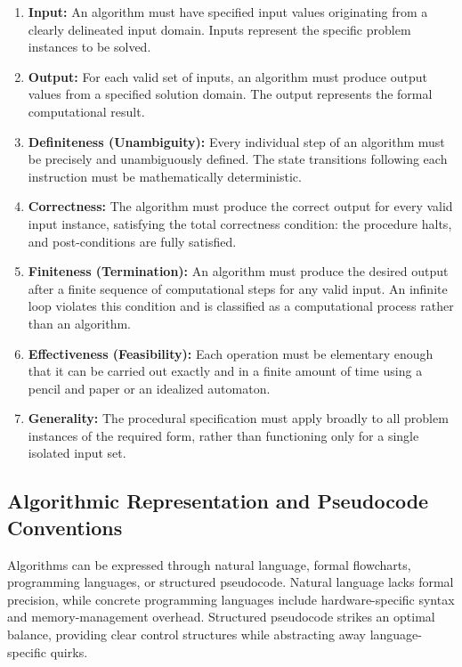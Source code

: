 \documentclass[10pt,a4paper]{article}
\theoremstyle{definition}
\begin{document}
\begin{enumerate}[leftmargin=*,itemsep=1pt,topsep=2pt]
    \item \textbf{Input:} An algorithm must have specified input values originating from a clearly delineated input domain. Inputs represent the specific problem instances to be solved.
    \item \textbf{Output:} For each valid set of inputs, an algorithm must produce output values from a specified solution domain. The output represents the formal computational result.
    \item \textbf{Definiteness (Unambiguity):} Every individual step of an algorithm must be precisely and unambiguously defined. The state transitions following each instruction must be mathematically deterministic.
    \item \textbf{Correctness:} The algorithm must produce the correct output for every valid input instance, satisfying the total correctness condition: the procedure halts, and post-conditions are fully satisfied.
    \item \textbf{Finiteness (Termination):} An algorithm must produce the desired output after a finite sequence of computational steps for any valid input. An infinite loop violates this condition and is classified as a computational process rather than an algorithm.
    \item \textbf{Effectiveness (Feasibility):} Each operation must be elementary enough that it can be carried out exactly and in a finite amount of time using a pencil and paper or an idealized automaton.
    \item \textbf{Generality:} The procedural specification must apply broadly to all problem instances of the required form, rather than functioning only for a single isolated input set.
\end{enumerate}

\subsection{Algorithmic Representation and Pseudocode Conventions}
Algorithms can be expressed through natural language, formal flowcharts, programming languages, or structured pseudocode. Natural language lacks formal precision, while concrete programming languages include hardware-specific syntax and memory-management overhead. Structured pseudocode strikes an optimal balance, providing clear control structures while abstracting away language-specific quirks.
\end{document}
